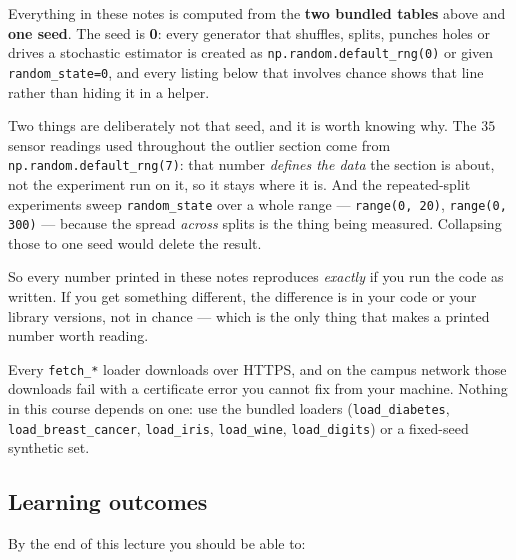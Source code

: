 \documentclass[11pt]{article}
\begin{document}
\begin{keyidea}
Everything in these notes is computed from the \textbf{two bundled tables}
above and \textbf{one seed}. The seed is \textbf{0}: every generator that
shuffles, splits, punches holes or drives a stochastic estimator is created as
\texttt{np.random.default\_rng(0)} or given \texttt{random\_state=0}, and
every listing below that involves chance shows that line rather than hiding it
in a helper.

Two things are deliberately not that seed, and it is worth knowing why.
The $35$ sensor readings used throughout the outlier section come from
\texttt{np.random.default\_rng(7)}: that number \emph{defines the data} the
section is about, not the experiment run on it, so it stays where it is. And
the repeated-split experiments sweep \texttt{random\_state} over a whole
range --- \texttt{range(0, 20)}, \texttt{range(0, 300)} --- because the
spread \emph{across} splits is the thing being measured. Collapsing those to
one seed would delete the result.

So every number printed in these notes reproduces \emph{exactly} if you run
the code as written. If you get something different, the difference is in your
code or your library versions, not in chance --- which is the only thing that
makes a printed number worth reading.
\end{keyidea}

\begin{caution}
Every \texttt{fetch\_*} loader downloads over HTTPS, and on the campus network
those downloads fail with a certificate error you cannot fix from your machine.
Nothing in this course depends on one: use the bundled loaders
(\texttt{load\_diabetes}, \texttt{load\_breast\_cancer}, \texttt{load\_iris},
\texttt{load\_wine}, \texttt{load\_digits}) or a fixed-seed synthetic set.
\end{caution}

\subsection{Learning outcomes}

By the end of this lecture you should be able to:
\end{document}
